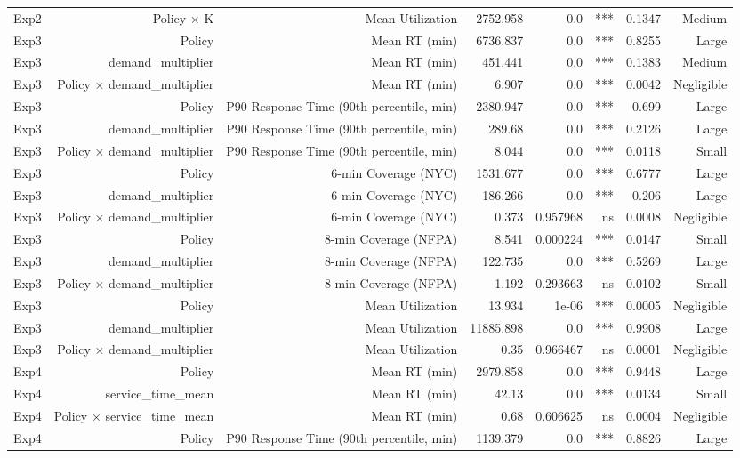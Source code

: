 \begin{table}[htbp]
\begin{tabular}{lrrrrrrr}
Exp2 & Policy × K & Mean Utilization & 2752.958 & 0.0 & *** & 0.1347 & Medium \\
Exp3 & Policy & Mean RT (min) & 6736.837 & 0.0 & *** & 0.8255 & Large \\
Exp3 & demand_multiplier & Mean RT (min) & 451.441 & 0.0 & *** & 0.1383 & Medium \\
Exp3 & Policy × demand_multiplier & Mean RT (min) & 6.907 & 0.0 & *** & 0.0042 & Negligible \\
Exp3 & Policy & P90 Response Time (90th percentile, min) & 2380.947 & 0.0 & *** & 0.699 & Large \\
Exp3 & demand_multiplier & P90 Response Time (90th percentile, min) & 289.68 & 0.0 & *** & 0.2126 & Large \\
Exp3 & Policy × demand_multiplier & P90 Response Time (90th percentile, min) & 8.044 & 0.0 & *** & 0.0118 & Small \\
Exp3 & Policy & 6-min Coverage (NYC) & 1531.677 & 0.0 & *** & 0.6777 & Large \\
Exp3 & demand_multiplier & 6-min Coverage (NYC) & 186.266 & 0.0 & *** & 0.206 & Large \\
Exp3 & Policy × demand_multiplier & 6-min Coverage (NYC) & 0.373 & 0.957968 & ns & 0.0008 & Negligible \\
Exp3 & Policy & 8-min Coverage (NFPA) & 8.541 & 0.000224 & *** & 0.0147 & Small \\
Exp3 & demand_multiplier & 8-min Coverage (NFPA) & 122.735 & 0.0 & *** & 0.5269 & Large \\
Exp3 & Policy × demand_multiplier & 8-min Coverage (NFPA) & 1.192 & 0.293663 & ns & 0.0102 & Small \\
Exp3 & Policy & Mean Utilization & 13.934 & 1e-06 & *** & 0.0005 & Negligible \\
Exp3 & demand_multiplier & Mean Utilization & 11885.898 & 0.0 & *** & 0.9908 & Large \\
Exp3 & Policy × demand_multiplier & Mean Utilization & 0.35 & 0.966467 & ns & 0.0001 & Negligible \\
Exp4 & Policy & Mean RT (min) & 2979.858 & 0.0 & *** & 0.9448 & Large \\
Exp4 & service_time_mean & Mean RT (min) & 42.13 & 0.0 & *** & 0.0134 & Small \\
Exp4 & Policy × service_time_mean & Mean RT (min) & 0.68 & 0.606625 & ns & 0.0004 & Negligible \\
Exp4 & Policy & P90 Response Time (90th percentile, min) & 1139.379 & 0.0 & *** & 0.8826 & Large \\

\end{tabular}
\end{table}
